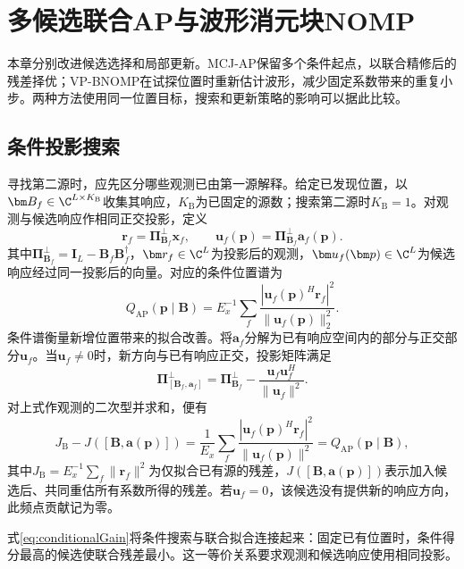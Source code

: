 \section{多候选联合AP与波形消元块NOMP}\label{sec:methods}
本章分别改进候选选择和局部更新。MCJ-AP保留多个条件起点，以联合精修后的残差择优；VP-BNOMP在试探位置时重新估计波形，减少固定系数带来的重复小步。两种方法使用同一位置目标，搜索和更新策略的影响可以据此比较。
\subsection{条件投影搜索}
寻找第二源时，应先区分哪些观测已由第一源解释。给定已发现位置，以$\bm B_f\in\C^{L\times K_{\mathrm B}}$收集其响应，$K_{\mathrm B}$为已固定的源数；搜索第二源时$K_{\mathrm B}=1$。对观测与候选响应作相同正交投影，定义
\begin{equation}
 \bm r_f=\bm\Pi_{\bm B_f}^{\perp}\bm x_f,\qquad
 \bm u_f(\bm p)=\bm\Pi_{\bm B_f}^{\perp}\bm a_f(\bm p).
\end{equation}
其中$\bm\Pi_{\bm B_f}^{\perp}=\bm I_L-\bm B_f\bm B_f^\dagger$，$\bm r_f\in\C^L$为投影后的观测，$\bm u_f(\bm p)\in\C^L$为候选响应经过同一投影后的向量。对应的条件位置谱为
\begin{equation}
 Q_{\mathrm{AP}}(\bm p\mid\bm B)
 =E_x^{-1}\sum_f\frac{|\bm u_f(\bm p)^H\bm r_f|^2}
 {\|\bm u_f(\bm p)\|_2^2}.\label{eq:conditional}
\end{equation}
条件谱衡量新增位置带来的拟合改善。将$\bm a_f$分解为已有响应空间内的部分与正交部分$\bm u_f$。当$\bm u_f\ne0$时，新方向与已有响应正交，投影矩阵满足
\begin{equation}
 \bm\Pi_{[\bm B_f,\bm a_f]}^{\perp}
 =\bm\Pi_{\bm B_f}^{\perp}
 -\frac{\bm u_f\bm u_f^H}{\|\bm u_f\|^2} .
\end{equation}
对上式作观测的二次型并求和，便有
\begin{equation}
 J_{\mathrm B}-J([\bm B,\bm a(\bm p)])
 =\frac1{E_x}\sum_f\frac{|\bm u_f(\bm p)^H\bm r_f|^2}
 {\|\bm u_f(\bm p)\|^2}
 =Q_{\mathrm{AP}}(\bm p\mid\bm B),\label{eq:conditionalGain}
\end{equation}
其中$J_{\mathrm B}=E_x^{-1}\sum_f\|\bm r_f\|^2$为仅拟合已有源的残差，$J([\bm B,\bm a(\bm p)])$表示加入候选后、共同重估所有系数所得的残差。若$\bm u_f=0$，该候选没有提供新的响应方向，此频点贡献记为零。

式\eqref{eq:conditionalGain}将条件搜索与联合拟合连接起来：固定已有位置时，条件得分最高的候选使联合残差最小\cite{ChenHudsonYao2002}。这一等价关系要求观测和候选响应使用相同投影。


